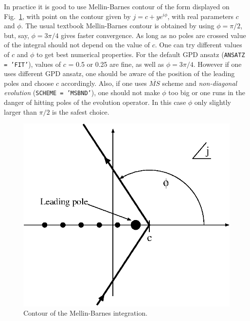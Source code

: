 \documentclass[12pt]{article}
\begin{document}
In practice it is good to use Mellin-Barnes contour of the form displayed
on Fig.~\ref{fig:MellinBarnes}, with point on the contour given
by $j=c+ye^{i\phi}$, with real parameters $c$ and $\phi$.
The usual textbook Mellin-Barnes contour is obtained by
using $\phi = \pi/2$, but, say, $\phi = 3\pi /4$ gives faster
convergence. As long as no poles are crossed value of the
integral should not depend on the value of $c$. One can
try different values of $c$ and $\phi$ to get best numerical
properties. 
For the default GPD ansatz (\texttt{ANSATZ = 'FIT'}), values of  $c$ = 0.5 or 0.25 are
fine, as well as $\phi = 3\pi/4$. However if one uses different GPD ansatz, one should
be aware of the position of the leading poles and choose $c$ accordingly. Also, if
one uses $\overline{MS}$ scheme and \emph{non-diagonal evolution} (\texttt{SCHEME = 'MSBND'}),
one should not make $\phi$ too big or one runs in the danger of hitting poles of
the evolution operator. In this case $\phi$ only slightly larger than $\pi/2$ is the
safest choice.

\begin{figure}
\begin{center}
\includegraphics[scale=1.0]{MellinBarnes}
\end{center}
\caption{Contour of the Mellin-Barnes integration.}
\label{fig:MellinBarnes}
\end{figure}
\end{document}
